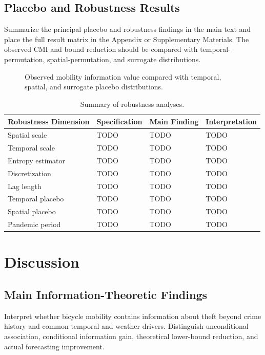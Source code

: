 \documentclass[applsci,article,submit,moreauthors]{Definitions/mdpi}
\begin{document}
\subsection{Placebo and Robustness Results}
\label{subsec:results_robustness}

Summarize the principal placebo and robustness findings in the main text and place the full result matrix in the Appendix or Supplementary Materials. The observed CMI and bound reduction should be compared with temporal-permutation, spatial-permutation, and surrogate distributions.

\begin{figure}[H]
\centering
{}
\caption{Observed mobility information value compared with temporal, spatial, and surrogate placebo distributions.}
\label{fig:placebo_results}
\end{figure}

\begin{table}[H]
\caption{Summary of robustness analyses.}
\label{tab:robustness_summary}
\begin{tabularx}{\textwidth}{lXXX}
\toprule
\textbf{Robustness Dimension} & \textbf{Specification} & \textbf{Main Finding} & \textbf{Interpretation}\\
\midrule
Spatial scale & TODO & TODO & TODO\\
Temporal scale & TODO & TODO & TODO\\
Entropy estimator & TODO & TODO & TODO\\
Discretization & TODO & TODO & TODO\\
Lag length & TODO & TODO & TODO\\
Temporal placebo & TODO & TODO & TODO\\
Spatial placebo & TODO & TODO & TODO\\
Pandemic period & TODO & TODO & TODO\\
\bottomrule
\end{tabularx}
\end{table}

\section{Discussion}
\label{sec:discussion}

\subsection{Main Information-Theoretic Findings}
Interpret whether bicycle mobility contains information about theft beyond crime history and common temporal and weather drivers. Distinguish unconditional association, conditional information gain, theoretical lower-bound reduction, and actual forecasting improvement.
\end{document}
